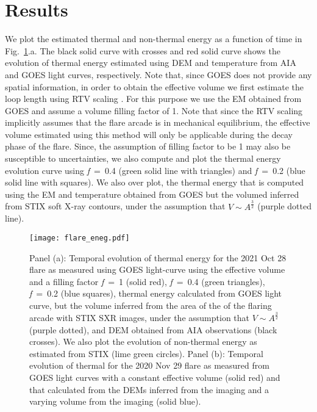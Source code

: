 \section{Results}\label{res}

We plot the estimated thermal and non-thermal energy as a function of time in Fig.~\ref{fig:eneg}.a. The black solid curve with crosses and red solid curve shows the evolution of thermal energy estimated using DEM and temperature from AIA and GOES light curves, respectively. Note that, since GOES does not provide any spatial information, in order to obtain the effective volume we first estimate the loop length using RTV scaling \citep{rtv78,serio91}. For this purpose we use the EM obtained from GOES and assume a volume filling factor of 1. Note that since the RTV scaling implicitly assumes that the flare arcade is in mechanical equilibrium, the effective volume estimated using this method will only be applicable during the decay phase of the flare. Since, the assumption of filling factor to be 1 may also be susceptible to uncertainties, we also compute and plot the thermal energy evolution curve using \textit{f}~=~0.4 (green solid line with triangles) and \textit{f}~=~0.2 (blue solid line with squares). We also over plot, the thermal energy that is computed using the EM and temperature obtained from GOES but the volumed inferred from STIX soft X-ray contours, under the assumption that $V\sim A^{\frac{3}{2}}$ (purple dotted line).

\begin{figure}[ht!]
    \centering
    \texttt{[image: flare\_eneg.pdf]}
    \caption{Panel (a): Temporal evolution of thermal energy for the 2021 Oct 28 flare as measured using GOES light-curve using the effective volume and a filling factor \textit{f}~=~1 (solid red), \textit{f}~=~0.4 (green triangles), \textit{f}~=~0.2 (blue squares), thermal energy calculated from GOES light curve, but the volume inferred from the area of the of the flaring arcade with STIX SXR images, under the assumption that $V\sim A^{\frac{3}{2}}$ (purple dotted), and DEM obtained from AIA observations (black crosses). We also plot the evolution of non-thermal energy as estimated from STIX (lime green circles). Panel (b): Temporal evolution of thermal for the 2020 Nov 29 flare as measured from GOES light curves with a constant effective volume (solid red) and that calculated from the DEMs inferred from the imaging and a varying volume from the imaging (solid blue).}
    \label{fig:eneg}
\end{figure}

